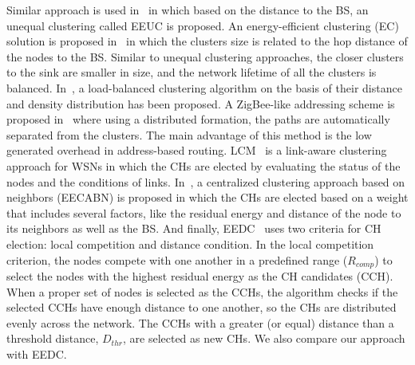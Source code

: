 \documentclass[journal]{IEEEtran}
\begin{document}
Similar approach is used in~\cite{UCR} in which based on the distance to the BS, an unequal clustering called EEUC is proposed.
An energy-efficient clustering (EC) solution is proposed in~\cite{EC2011} in which the clusters size is related to the hop distance of the nodes to the BS.  Similar to unequal clustering approaches, the closer clusters to the sink are smaller in size, and the network lifetime of all the clusters is balanced.   
In~\cite{load2013}, a load-balanced clustering algorithm on the basis of their distance and density distribution has been proposed.  A ZigBee-like addressing scheme is proposed in~\cite{pcc2012} where using a distributed formation, the paths are automatically separated from the clusters.  The main advantage of this method is the low generated overhead in address-based routing.
LCM~\cite{lcm2013} is a link-aware clustering approach for WSNs in which the CHs  are elected by evaluating the status of the nodes and the conditions of links. 
In~\cite{Wei2011}, a centralized clustering approach based on neighbors (EECABN) is proposed in which  the CHs are elected based on a weight that includes several factors, like the residual energy and distance of the node to its neighbors  as well as the BS.  And finally, EEDC~\cite{EEDC} uses two criteria for CH election: local competition and distance condition. In the local competition criterion, the nodes compete with one another in a predefined range ($R_{comp}$)  to select the nodes with the highest residual energy as the CH candidates (CCH). When a proper set of  nodes is selected as the CCHs, the algorithm checks if the selected CCHs have enough distance to one another, so the CHs are distributed evenly across the network. The CCHs with a greater (or equal) distance than a threshold distance, $D_{thr}$, are selected as new CHs.  We also compare our approach with EEDC.
\end{document}
